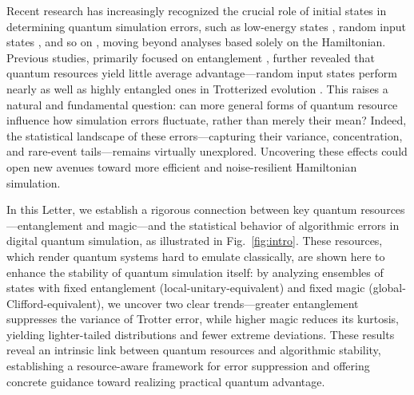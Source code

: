 \documentclass[showpacs,amsmath,amssymb,twocolumn,aps,pra,superscriptaddress,notitlepage,10pt]{revtex4-2}
\begin{document}
Recent research has increasingly recognized the crucial role of initial states in determining quantum simulation errors, such as low-energy states \cite{csahinouglu2021hamiltonian,Mizuta2025Trotterization,Gong2024complexityofdigital,hejazi2024betterboundslowenergyproduct,yi_spectral_2022}, random input states \cite{zhao_hamiltonian_2022,chen2024average}, and so on \cite{PhysRevA.107.L040201,PhysRevResearch.6.043155,becker2025convergence,Mobus2024strongboundstrotter,fang2025trottererrormanybodyquantum,hatomura2023firstordertrotterdecompositiondynamicalinvariant,Hatomura2022StateDependentPRA,an2021time,su2021nearly,xuExponentiallyDecayingQuantum2025}, moving beyond analyses based solely on the Hamiltonian.
Previous studies, primarily focused on entanglement  \cite{zhao2024entanglementacceleratesquantumsimulation}, further revealed that quantum resources yield little average advantage—random input states perform nearly as well as highly entangled ones in Trotterized evolution \cite{zhao2024entanglementacceleratesquantumsimulation,zhao_hamiltonian_2022,chen2024average}.
This raises a natural and fundamental question: can more general forms of quantum resource influence how simulation errors fluctuate, rather than merely their mean? Indeed, the statistical landscape of these errors—capturing their variance, concentration, and rare-event tails—remains virtually unexplored. Uncovering these effects could open new avenues toward more efficient and noise-resilient Hamiltonian simulation.

In this Letter, we establish a rigorous connection between key quantum resources—entanglement and magic—and the statistical behavior of algorithmic errors in digital quantum simulation, as illustrated in Fig.~\ref{fig:intro}.
These resources, which render quantum systems hard to emulate classically, are shown here to enhance the stability of quantum simulation itself: by analyzing ensembles of states with fixed entanglement (local-unitary-equivalent) and fixed magic (global-Clifford-equivalent), we uncover two clear trends—greater entanglement suppresses the variance of Trotter error, while higher magic reduces its kurtosis, yielding lighter-tailed distributions and fewer extreme deviations.
These results reveal an intrinsic link between quantum resources and algorithmic stability, establishing a resource-aware framework for error suppression and offering concrete guidance toward realizing practical quantum advantage.
\end{document}

